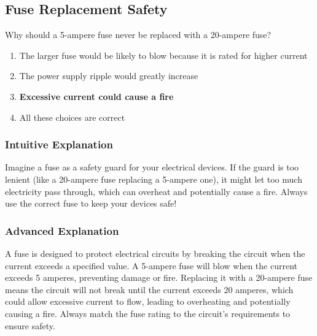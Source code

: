\subsection{Fuse Replacement Safety}
\label{T0A05}

\begin{tcolorbox}[colback=gray!10!white,colframe=black!75!black,title=T0A05]
Why should a 5-ampere fuse never be replaced with a 20-ampere fuse?
\begin{enumerate}[noitemsep]
    \item The larger fuse would be likely to blow because it is rated for higher current
    \item The power supply ripple would greatly increase
    \item \textbf{Excessive current could cause a fire}
    \item All these choices are correct
\end{enumerate}
\end{tcolorbox}

\subsubsection*{Intuitive Explanation}
Imagine a fuse as a safety guard for your electrical devices. If the guard is too lenient (like a 20-ampere fuse replacing a 5-ampere one), it might let too much electricity pass through, which can overheat and potentially cause a fire. Always use the correct fuse to keep your devices safe!

\subsubsection*{Advanced Explanation}
A fuse is designed to protect electrical circuits by breaking the circuit when the current exceeds a specified value. A 5-ampere fuse will blow when the current exceeds 5 amperes, preventing damage or fire. Replacing it with a 20-ampere fuse means the circuit will not break until the current exceeds 20 amperes, which could allow excessive current to flow, leading to overheating and potentially causing a fire. Always match the fuse rating to the circuit's requirements to ensure safety.